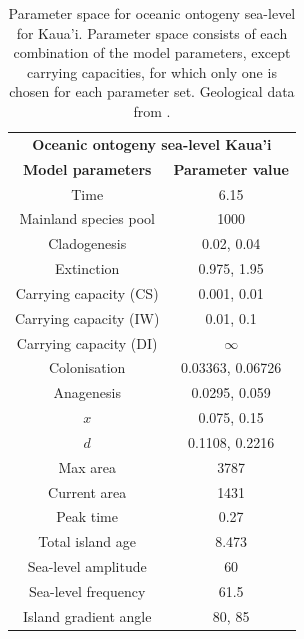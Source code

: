\begin{table}[ht]
    \centering
    \caption{Parameter space for oceanic ontogeny sea-level for Kaua'i. Parameter space consists of each combination of the model parameters, except carrying capacities, for which only one is chosen for each parameter set. Geological data from \cite{lim_true_2017}.}
    \begin{tabular}{ c | c }
        \multicolumn{2}{c}{\textbf{Oceanic ontogeny sea-level Kaua'i}} \\
        \textbf{Model parameters} & \textbf{Parameter value} \\ 
        \hline
        \hline
        Time & 6.15 \\
        \hline
        Mainland species pool & 1000 \\
        \hline
        Cladogenesis & 0.02, 0.04 \\
        \hline
        Extinction & 0.975, 1.95 \\
        \hline
        Carrying capacity (CS) & 0.001, 0.01 \\
        \hline
        Carrying capacity (IW) & 0.01, 0.1 \\
        \hline
        Carrying capacity (DI) & $\infty$ \\
        \hline
        Colonisation & 0.03363, 0.06726 \\
        \hline
        Anagenesis & 0.0295, 0.059 \\
        \hline
        $x$ & 0.075, 0.15 \\
        \hline
        $d$ & 0.1108, 0.2216 \\
        \hline
        Max area & 3787 \\
        \hline
        Current area & 1431 \\
        \hline
        Peak time & 0.27 \\
        \hline
        Total island age & 8.473 \\
        \hline
        Sea-level amplitude & 60 \\
        \hline
        Sea-level frequency & 61.5 \\
        \hline
        Island gradient angle & 80, 85 \\
    \end{tabular}
    \label{tab:oceanic_ontogeny_sea_level_old}
\end{table}

